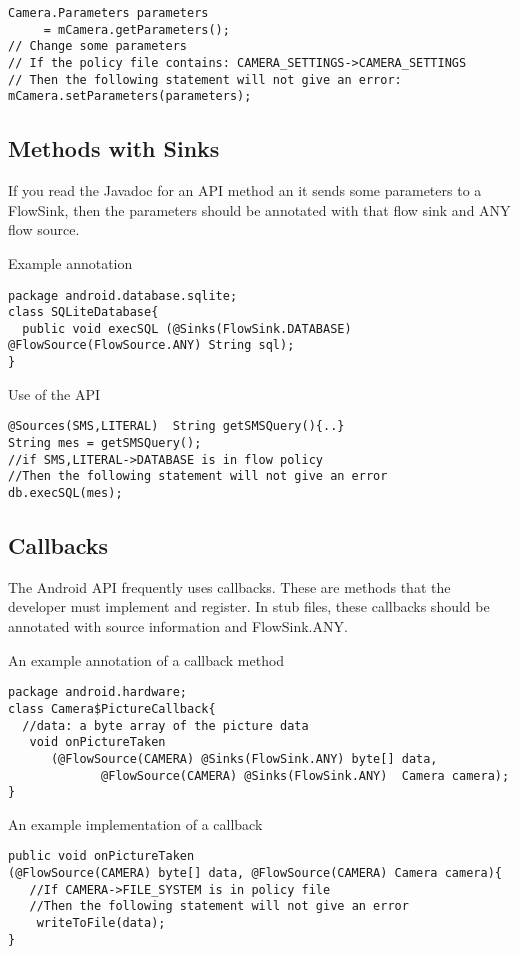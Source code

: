 \begin{Verbatim}
Camera.Parameters parameters
     = mCamera.getParameters();
// Change some parameters
// If the policy file contains: CAMERA_SETTINGS->CAMERA_SETTINGS
// Then the following statement will not give an error:
mCamera.setParameters(parameters);
\end{Verbatim}



\subsection{Methods with Sinks}
If you read the Javadoc for an API method an it sends some parameters to a FlowSink, then the parameters
should be annotated with that flow sink and ANY flow source.  

Example annotation
\begin{Verbatim}
package android.database.sqlite;
class SQLiteDatabase{
  public void execSQL (@Sinks(FlowSink.DATABASE) @FlowSource(FlowSource.ANY) String sql);
}
\end{Verbatim}
Use of the API
\begin{Verbatim}
@Sources(SMS,LITERAL)  String getSMSQuery(){..}
String mes = getSMSQuery();
//if SMS,LITERAL->DATABASE is in flow policy
//Then the following statement will not give an error
db.execSQL(mes);
\end{Verbatim}

\subsection{Callbacks}
The Android API frequently uses callbacks.  These are methods that the developer must 
implement and register.  In stub files, these callbacks should be annotated
with source information and FlowSink.ANY.  

An example annotation of a callback method
\begin{Verbatim}
package android.hardware;
class Camera$PictureCallback{
  //data: a byte array of the picture data
   void onPictureTaken 
      (@FlowSource(CAMERA) @Sinks(FlowSink.ANY) byte[] data, 
             @FlowSource(CAMERA) @Sinks(FlowSink.ANY)  Camera camera);
}
\end{Verbatim}

An example implementation of a callback
\begin{Verbatim}
public void onPictureTaken
(@FlowSource(CAMERA) byte[] data, @FlowSource(CAMERA) Camera camera){
   //If CAMERA->FILE_SYSTEM is in policy file
   //Then the following statement will not give an error
    writeToFile(data);
}
\end{Verbatim}


